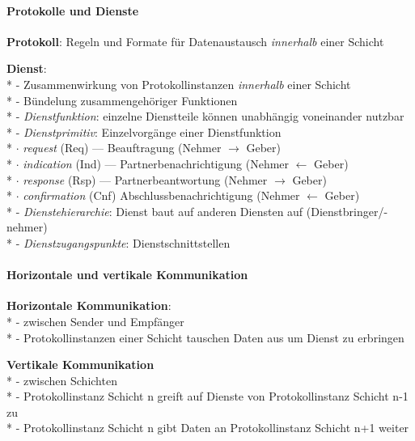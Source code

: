 \paragraph{Protokolle und Dienste}
\begin{items}
  \item \textbf{Protokoll}: Regeln und Formate für Datenaustausch \emph{innerhalb} einer Schicht
  \item \textbf{Dienst}: \\*
    - Zusammenwirkung von Protokollinstanzen \emph{innerhalb} einer Schicht \\*
    - Bündelung zusammengehöriger Funktionen \\*
    - \emph{Dienstfunktion}: einzelne Dienstteile können unabhängig voneinander nutzbar \\*
    - \emph{Dienstprimitiv}: Einzelvorgänge einer Dienstfunktion \\*
      \phantom{-} \( \cdot \) \emph{request} (Req) --- Beauftragung (Nehmer \( \to \) Geber) \\*
      \phantom{-} \( \cdot \) \emph{indication} (Ind) --- Partnerbenachrichtigung (Nehmer \( \leftarrow \) Geber) \\*
      \phantom{-} \( \cdot \) \emph{response} (Rsp) --- Partnerbeantwortung (Nehmer \( \to \) Geber) \\*
      \phantom{-} \( \cdot \) \emph{confirmation} (Cnf) Abschlussbenachrichtigung (Nehmer \( \leftarrow  \) Geber) \\*
    - \emph{Dienstehierarchie}: Dienst baut auf anderen Diensten auf (Dienstbringer/-nehmer) \\*
    - \emph{Dienstzugangspunkte}: Dienstschnittstellen
\end{items}

\paragraph{Horizontale und vertikale Kommunikation}
\begin{items}
  \item \textbf{Horizontale Kommunikation}: \\*
    - zwischen Sender und Empfänger \\*
    - Protokollinstanzen einer Schicht tauschen Daten aus um Dienst zu erbringen
  \item \textbf{Vertikale Kommunikation} \\*
    - zwischen Schichten \\*
    - Protokollinstanz Schicht n greift auf Dienste von Protokollinstanz Schicht n-1 zu \\*
    - Protokollinstanz Schicht n gibt Daten an Protokollinstanz Schicht n+1 weiter
\end{items}

